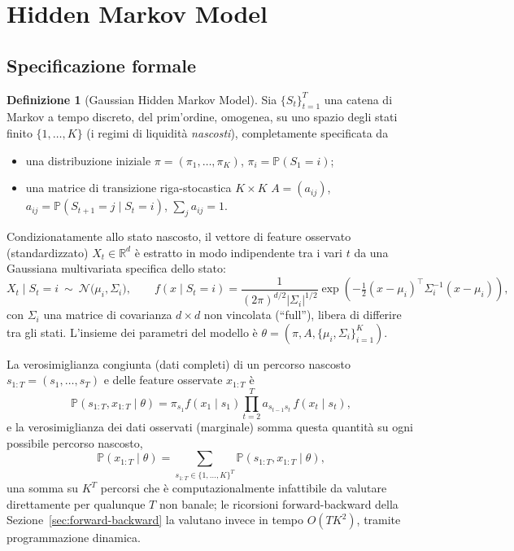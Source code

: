 \documentclass[11pt]{article}
\theoremstyle{definition}
\newtheorem{definition}[theorem]{Definizione}
\theoremstyle{remark}
\begin{document}
\section{Hidden Markov Model}
\label{sec:hmm}

\subsection{Specificazione formale}
\label{sec:hmm-spec}

\begin{definition}[Gaussian Hidden Markov Model]
Sia $\{S_t\}_{t=1}^{T}$ una catena di Markov a tempo discreto, del prim'ordine, omogenea, su uno spazio degli stati finito $\{1,\dots,K\}$ (i regimi di liquidit\`a \emph{nascosti}), completamente specificata da
\begin{itemize}
    \item una distribuzione iniziale $\pi=(\pi_1,\dots,\pi_K)$, $\pi_i=\mathbb{P}(S_1=i)$;
    \item una matrice di transizione riga-stocastica $K\times K$ $A=(a_{ij})$, $a_{ij}=\mathbb{P}(S_{t+1}=j\mid S_t=i)$, $\sum_j a_{ij}=1$.
\end{itemize}
Condizionatamente allo stato nascosto, il vettore di feature osservato (standardizzato) $X_t\in\mathbb{R}^d$ \`e estratto in modo indipendente tra i vari $t$ da una Gaussiana multivariata specifica dello stato:
\[
X_t \mid S_t=i \ \sim\ \mathcal{N}\big(\mu_i,\Sigma_i\big), \qquad
f(x\mid S_t=i) = \frac{1}{(2\pi)^{d/2}|\Sigma_i|^{1/2}}\exp\!\left(-\tfrac12(x-\mu_i)^\top\Sigma_i^{-1}(x-\mu_i)\right),
\]
con $\Sigma_i$ una matrice di covarianza $d\times d$ non vincolata (``full''), libera di differire tra gli stati. L'insieme dei parametri del modello \`e $\theta=(\pi,A,\{\mu_i,\Sigma_i\}_{i=1}^K)$.
\end{definition}

La verosimiglianza congiunta (dati completi) di un percorso nascosto $s_{1:T}=(s_1,\dots,s_T)$ e delle feature osservate $x_{1:T}$ \`e
\[
\mathbb{P}(s_{1:T},x_{1:T}\mid\theta) = \pi_{s_1}f(x_1\mid s_1)\prod_{t=2}^{T}a_{s_{t-1}s_t}\,f(x_t\mid s_t),
\]
e la verosimiglianza dei dati osservati (marginale) somma questa quantit\`a su ogni possibile percorso nascosto,
\[
\mathbb{P}(x_{1:T}\mid\theta) = \sum_{s_{1:T}\in\{1,\dots,K\}^T}\mathbb{P}(s_{1:T},x_{1:T}\mid\theta),
\]
una somma su $K^T$ percorsi che \`e computazionalmente infattibile da valutare direttamente per qualunque $T$ non banale; le ricorsioni forward-backward della Sezione~\ref{sec:forward-backward} la valutano invece in tempo $O(TK^2)$, tramite programmazione dinamica.
\end{document}
